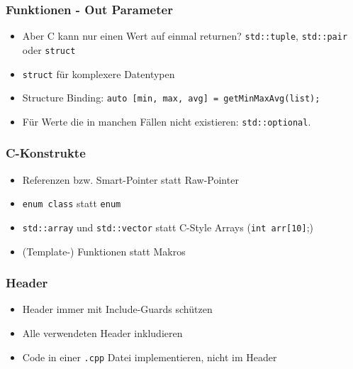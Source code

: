 \documentclass[aspectratio=169]{beamer}
\begin{document}
\begin{frame}
    \frametitle{Funktionen - Out Parameter}
    \begin{itemize}
        \item Aber C kann nur einen Wert auf einmal returnen? \pause \lstinline{std::tuple}, \lstinline{std::pair} oder \lstinline{struct}
            \pause
        \item \lstinline{struct} für komplexere Datentypen
            \pause
        \item Structure Binding:
            \lstinline{auto [min, max, avg] = getMinMaxAvg(list);}
            \pause
        \item Für Werte die in manchen Fällen nicht existieren: \lstinline{std::optional}.
            
    \end{itemize}
\end{frame}

\begin{frame}
    \frametitle{C-Konstrukte}
    \begin{itemize}
        \item Referenzen bzw. Smart-Pointer statt Raw-Pointer
            \pause
        \item \lstinline{enum class} statt \lstinline{enum}
            \pause
        \item \lstinline{std::array} und \lstinline{std::vector} statt C-Style Arrays (\lstinline{int arr[10]};)
            \pause
        \item (Template-) Funktionen statt Makros
    \end{itemize}
\end{frame}

\begin{frame}
    \frametitle{Header}
    \begin{itemize}
        \item Header immer mit Include-Guards schützen
            
        \item Alle verwendeten Header inkludieren
            \pause
        \item Code in einer \lstinline{.cpp} Datei implementieren, nicht im Header
    \end{itemize}            
\end{frame}
\end{document}

